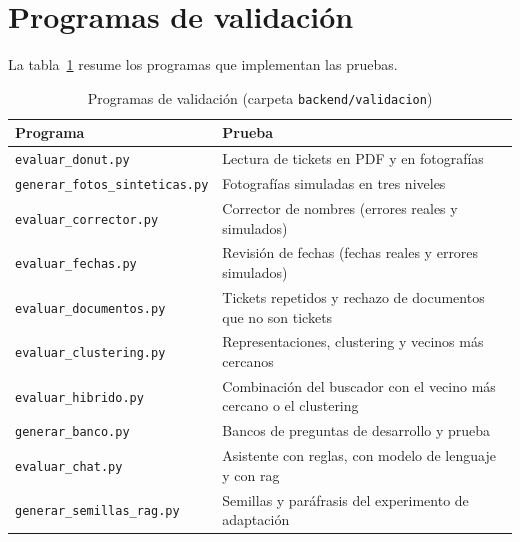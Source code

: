 \section{Programas de validación}
La tabla~\ref{tab:scripts-validacion} resume los programas que implementan las pruebas.

\begin{table}[htbp]
    \caption{\label{tab:scripts-validacion}Programas de validación (carpeta \texttt{backend/validacion})}
    \begin{tabularx}{\textwidth}{@{}lX@{}}
        \toprule
        \textbf{Programa} & \textbf{Prueba} \\
        \midrule
        \texttt{evaluar\_donut.py} & Lectura de tickets en PDF y en fotografías \\
        \texttt{generar\_fotos\_sinteticas.py} & Fotografías simuladas en tres niveles \\
        \texttt{evaluar\_corrector.py} & Corrector de nombres (errores reales y simulados) \\
        \texttt{evaluar\_fechas.py} & Revisión de fechas (fechas reales y errores simulados) \\
        \texttt{evaluar\_documentos.py} & Tickets repetidos y rechazo de documentos que no son tickets \\
        \texttt{evaluar\_clustering.py} & Representaciones, clustering y vecinos más cercanos \\
        \texttt{evaluar\_hibrido.py} & Combinación del buscador con el vecino más cercano o el clustering \\
        \texttt{generar\_banco.py} & Bancos de preguntas de desarrollo y prueba \\
        \texttt{evaluar\_chat.py} & Asistente con reglas, con modelo de lenguaje y con \gls{rag} \\
        \texttt{generar\_semillas\_rag.py} & Semillas y paráfrasis del experimento de adaptación \\
        \bottomrule
    \end{tabularx}
\end{table}

